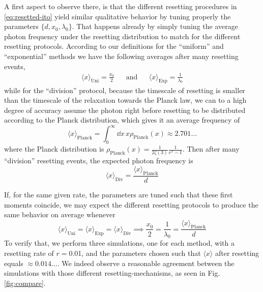 \documentclass[a4paper,12pt,reqno,superscriptaddress,nofootinbib]{revtex4}
\theoremstyle{plain}
\theoremstyle{definition}
\theoremstyle{remark}
\newcommand{\0}{^{(0)}}
\newcommand{\1}{^{(1)}}
\newcommand{\2}{^{(2)}}
\begin{document}
A first aspect to observe there, is that the different resetting procedures in \eqref{eq:resetted-ito} yield similar qualitative behavior by tuning properly the parameters $\{d,x_0,\lambda_0\}$.  That happens already by simply tuning the average photon frequency under the resetting distribution to match for the different resetting protocols. According to our definitions for the ``uniform'' and ``exponential'' methods we have the following averages after many resetting events,
\begin{align*}\langle x \rangle_{\text{Uni}} = \frac{x_0}{2} &&\text{and}&& \langle x \rangle_\text{Exp} = \frac{1}{\lambda_0}\end{align*}
while for the ``division'' protocol, because the timescale of resetting is smaller than the timescale of the relaxation towards the Planck law, we can to a high degree of accuracy assume the photon right before resetting to be distributed according to the Planck distribution, which gives it an average frequency of
\[\langle x \rangle_\text{Planck} = \int_0^{\infty}\dd x\,  x\rho_\text{Planck}(x) \approx 2.701...\]
where the Planck distribution is $\rho_\text{Planck}(x) = \frac{1}{2\zeta(3)}\frac{1}{e^{x}-1}$. Then after many ``division'' resetting events, the expected photon frequency is
\[\langle x\rangle_{\text{Div}}=\frac{\langle x \rangle_\text{Planck}}{d} \]

If, for the same given rate, the parameters are tuned such that these first moments coincide, we may expect the different resetting protocols to produce the same behavior on average whenever
\[\langle x \rangle_\text{Uni} = \langle x \rangle_\text{Exp}=\langle x\rangle_{\text{Div}} \implies \frac{x_0}{2}=\frac{1}{\lambda_0} = \frac{\langle x \rangle_\text{Planck}}{d}
\]
To verify that, we perform three simulations, one for each method, with a resetting rate of $r=$\num{0.01}, and the parameters chosen such that $\langle x \rangle$ after resetting equals $\approx 0.014...$. We indeed observe a reasonable agreement between the simulations with those different resetting-mechanisms, as seen in Fig.\ref{fig:compare}.\\
\end{document}

